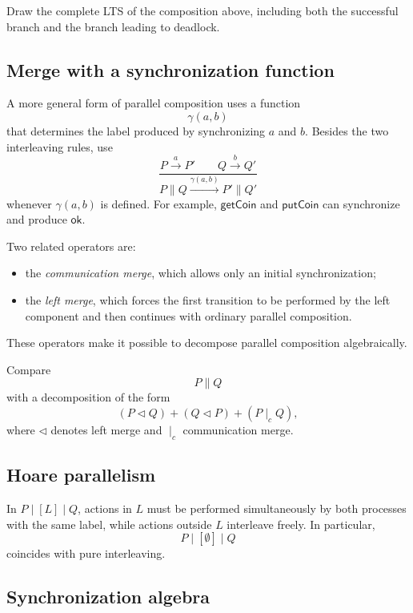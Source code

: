 \documentclass[a4paper]{article}
\newcommand{\trans}[1]{\xrightarrow{#1}}
\newcommand{\lmerge}{\mathbin{\lhd}}
\begin{document}
\begin{snippetexercise}{}
    Draw the complete LTS of the composition above, including both the successful branch and the branch leading to deadlock.
\end{snippetexercise}

\subsection{Merge with a synchronization function}

A more general form of parallel composition uses a function
\[
    \gamma(a,b)
\]
that determines the label produced by synchronizing \(a\) and \(b\).
Besides the two interleaving rules, use
\[
    \frac{P\trans{a}P'\qquad Q\trans{b}Q'}
    {P\parallel Q\trans{\gamma(a,b)}P'\parallel Q'}
\]
whenever \(\gamma(a,b)\) is defined.
For example, \(\mathsf{getCoin}\) and \(\mathsf{putCoin}\) can synchronize and produce \(\mathsf{ok}\).

Two related operators are:
\begin{itemize}
    \item the \emph{communication merge}, which allows only an initial synchronization;
    \item the \emph{left merge}, which forces the first transition to be performed by the left component and then continues with ordinary parallel composition.
\end{itemize}
These operators make it possible to decompose parallel composition algebraically.

\begin{snippetexercise}{}
    Compare
    \[
        P\parallel Q
    \]
    with a decomposition of the form
    \[
        (P\lmerge Q)
        +(Q\lmerge P)
        +(P\mid_c Q),
    \]
    where \(\lmerge\) denotes left merge and \(\mid_c\) communication merge.
\end{snippetexercise}

\subsection{Hoare parallelism}

In \(P\mid[L]\mid Q\), actions in \(L\) must be performed simultaneously by both processes with the same label, while actions outside \(L\) interleave freely.
In particular,
\[
    P\mid[\emptyset]\mid Q
\]
coincides with pure interleaving.

\subsection{Synchronization algebra}
\end{document}
